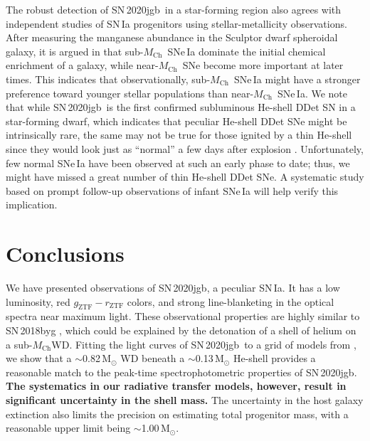 \documentclass[twocolumn]{aastex631}
\newcommand{\sn}{SN\,2020jgb}
\newcommand{\Mch}{$M_\mathrm{Ch}$}
\newcommand{\Msun}{\mathrm{M_\odot}}
\newcommand{\revise}[1]{\textbf{#1}}
\begin{document}
The robust detection of \sn\ in a star-forming region also agrees with independent studies of SN\,Ia progenitors using stellar-metallicity observations. After measuring the manganese abundance in the Sculptor dwarf spheroidal galaxy, it is argued in \citet{de_los_reyes_manganese_2020} that sub-\Mch\ SNe\,Ia dominate the initial chemical enrichment of a galaxy, while near-\Mch\ SNe become more important at later times. This indicates that observationally, sub-\Mch\ SNe\,Ia might have a stronger preference toward younger stellar populations than near-\Mch\ SNe\,Ia. 
We note that while \sn\ is the first confirmed subluminous He-shell DDet SN in a star-forming dwarf, which indicates that peculiar He-shell DDet SNe might be intrinsically rare, the same may not be true for those ignited by a thin He-shell since they would look just as  ``normal'' a few days after explosion \citep{Magee_2021}. Unfortunately, few normal SNe\,Ia have been observed at such an early phase to date; thus, we might have missed a great number of thin He-shell DDet SNe. A systematic study based on prompt follow-up observations of infant SNe\,Ia will help verify this implication.

\section{Conclusions} \label{sec:conclusion}
We have presented observations of \sn, a peculiar SN\,Ia. It has a low luminosity, red $g_\mathrm{ZTF}-r_\mathrm{ZTF}$ colors, and strong line-blanketing in the optical spectra near maximum light. These observational properties are highly similar to SN\,2018byg \citep{de_18byg_2019}, which could be explained by the detonation of a shell of helium on a sub-\Mch WD. Fitting the light curves of \sn\ to a grid of models from \citet{polin_observational_2019}, we show that a $\sim$0.82\,$\Msun$ WD beneath a $\sim$0.13\,$\Msun$ He-shell provides a reasonable match to the peak-time spectrophotometric properties of \sn. \revise{The systematics in our radiative transfer models, however, result in significant uncertainty in the shell mass.} The uncertainty in the host galaxy extinction also limits the precision on estimating total progenitor mass, with a reasonable upper limit being $\sim$1.00\,$\Msun$. 
\end{document}
